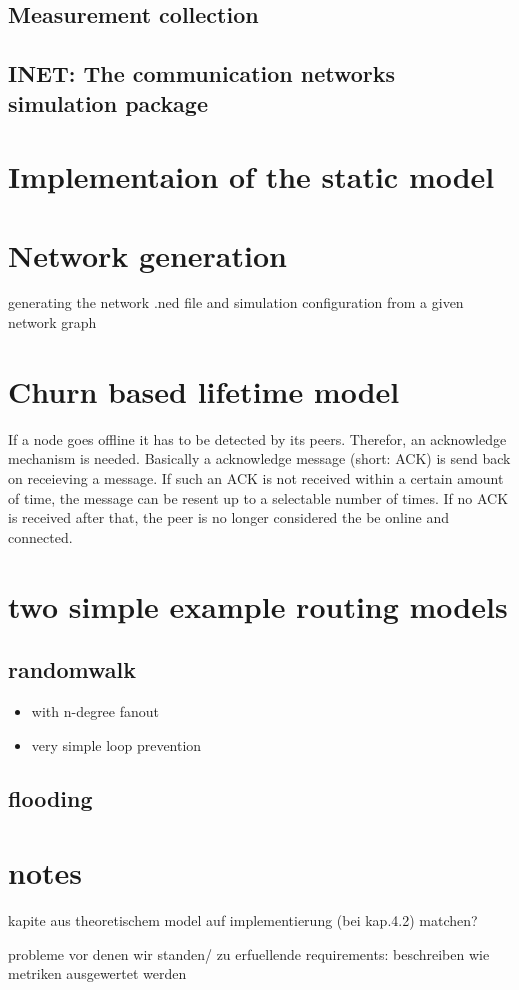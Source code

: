 \subsection{Measurement collection}

\subsection{INET: The communication networks simulation package}

\section{Implementaion of the static model}


\section{Network generation}

generating the network .ned file and simulation configuration from a given network graph

\section{Churn based lifetime model}
If a node goes offline it has to be detected by its peers. Therefor, an acknowledge mechanism is needed. Basically a acknowledge message (short: ACK) is send back on receieving a message. If such an ACK is not received within a certain amount of time, the message can be resent up to a selectable number of times. If no ACK is received after that, the peer is no longer considered the be online and connected.



\section{two simple example routing models}


\subsection{randomwalk}
\begin{itemize}
\item            with n-degree fanout
\item            very simple loop prevention
\end{itemize}
\subsection{flooding}

\section{notes}
kapite aus theoretischem model auf implementierung (bei kap.4.2) matchen?

probleme vor denen wir standen/ zu erfuellende requirements: beschreiben wie metriken ausgewertet werden
